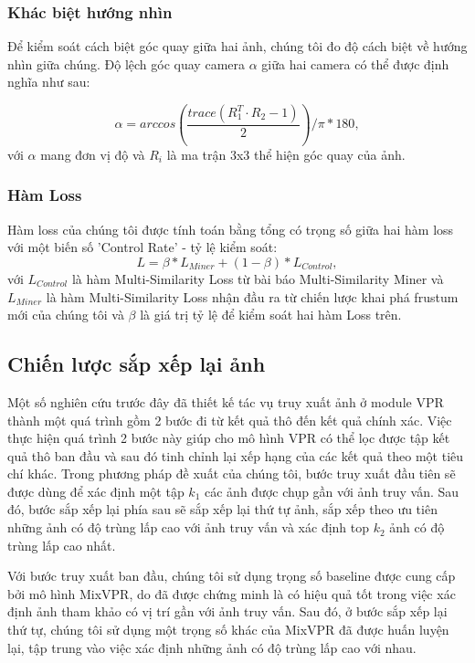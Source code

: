 \subsubsection*{Khác biệt hướng nhìn}

Để kiểm soát cách biệt góc quay giữa hai ảnh, chúng tôi đo độ cách biệt về hướng nhìn giữa chúng. Độ lệch góc quay camera $\alpha$ giữa hai camera có thể được định nghĩa như sau:

\begin{equation}
  \alpha = arccos\left(\frac{trace(R_1^T \cdot R_2 - 1)}{2} \right) / \pi * 180,
\end{equation}
với $\alpha$ mang đơn vị độ và $R_i$ là ma trận 3x3 thể hiện góc quay của ảnh.

\subsubsection*{Hàm Loss}

Hàm loss của chúng tôi được tính toán bằng tổng có trọng số giữa hai hàm loss với một biến số 'Control Rate' - tỷ lệ kiểm soát:
\begin{equation}
  L = \beta * L_{Miner} + (1-\beta)*L_{Control},
\end{equation}
với $L_{Control}$ là hàm Multi-Similarity Loss từ bài báo Multi-Similarity Miner và $L_{Miner}$ là hàm Multi-Similarity Loss nhận đầu ra từ chiến lược khai phá frustum mới của chúng tôi và $\beta$ là giá trị tỷ lệ để kiểm soát hai hàm Loss trên.

\subsection{Chiến lược sắp xếp lại ảnh}
Một số nghiên cứu trước đây đã thiết kế tác vụ truy xuất ảnh ở module VPR thành một quá trình gồm 2 bước đi từ kết quả thô đến kết quả chính xác. Việc thực hiện quá trình 2 bước này giúp cho mô hình VPR có thể lọc được tập kết quả thô ban đầu và sau đó tinh chỉnh lại xếp hạng của các kết quả theo một tiêu chí khác. Trong phương pháp đề xuất của chúng tôi, bước truy xuất đầu tiên sẽ được dùng để xác định một tập $k_1$ các ảnh được chụp gần với ảnh truy vấn. Sau đó, bước sắp xếp lại phía sau sẽ sắp xếp lại thứ tự ảnh, sắp xếp theo ưu tiên những ảnh có độ trùng lấp cao với ảnh truy vấn và xác định top $k_2$ ảnh có độ trùng lấp cao nhất.

Với bước truy xuất ban đầu, chúng tôi sử dụng trọng số baseline được cung cấp bởi mô hình MixVPR, do đã được chứng minh là có hiệu quả tốt trong việc xác định ảnh tham khảo có vị trí gần với ảnh truy vấn. Sau đó, ở bước sắp xếp lại thứ tự, chúng tôi sử dụng một trọng số khác của MixVPR đã được huấn luyện lại, tập trung vào việc xác định những ảnh có độ trùng lấp cao với nhau.

